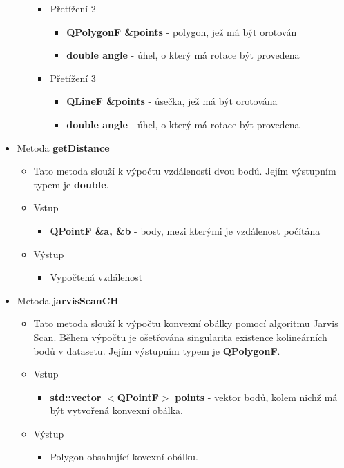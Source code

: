 \documentclass[a4paper, 12pt]{article}
\begin{document}
\begin{itemize}
\begin{itemize}
\begin{itemize}
					\item Přetížení 2
						\begin{itemize}
							\item \textbf{QPolygonF \&points} - polygon, jež má být orotován
							\item \textbf{double angle} - úhel, o který má rotace být provedena
 						\end{itemize}

					\item Přetížení 3
						\begin{itemize}
							\item \textbf{QLineF \&points} - úsečka, jež má být orotována
							\item \textbf{double angle} - úhel, o který má rotace být provedena
 						\end{itemize}					
				\end{itemize}
			
		\end{itemize}

	\item Metoda \textbf{getDistance}
		\begin{itemize}
			\item Tato metoda slouží k výpočtu vzdálenosti dvou bodů. Jejím výstupním typem je \textbf{double}.
			\item Vstup
				\begin{itemize}
					\item \textbf{QPointF \&a, \&b} - body, mezi kterými je vzdálenost počítána
				\end{itemize}
			\item Výstup
				\begin{itemize}	
					\item Vypočtená vzdálenost
				\end{itemize}
		\end{itemize}

	\item Metoda \textbf{jarvisScanCH}
		\begin{itemize}
			\item Tato metoda slouží k výpočtu konvexní obálky pomocí algoritmu Jarvis Scan. Během výpočtu je ošetřována singularita existence kolineárních bodů v datasetu. Jejím výstupním typem je \textbf{QPolygonF}.
			\item Vstup
				\begin{itemize}
					\item \textbf{std::vector} $<$\textbf{QPointF}$>$ \textbf{points} - vektor bodů, kolem nichž má být vytvořená konvexní obálka.
				\end{itemize}
			\item Výstup
				\begin{itemize}
					\item Polygon obsahující kovexní obálku.
				\end{itemize} 
		\end{itemize}


\end{itemize}
\end{document}
